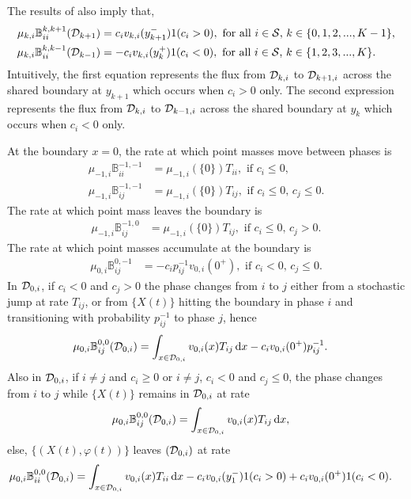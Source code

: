 The results of \cite{bo2014} also imply that, 
\begin{align*}
\mu_{k,i}\mathbb B_{ii}^{k,k+1}(\mathcal{D}_{k+1})&= c_iv_{k,i}(y_{k+1}^-) 1{(c_i>0)},\mbox{ for all \(i\in\mathcal{S}\), \(k\in\{0,1,2,...,K-1\}\),}
\\\mu_{k,i}\mathbb B_{ii}^{k,k-1}(\mathcal{D}_{k-1})&= -c_iv_{k,i}(y_{k}^+) 1{(c_i<0)}, \mbox{  for all \(i\in\mathcal{S}\), \(k\in\{1,2,3,...,K\}\)}.
\end{align*}
Intuitively, the first equation represents the flux from \(\mathcal{D}_{k,i}\) to \(\mathcal{D}_{k+1,i}\) across the shared boundary at \(y_{k+1}\) which occurs when \(c_i>0\) only. The second expression represents the flux from \(\mathcal{D}_{k,i}\) to \(\mathcal{D}_{k-1,i}\) across the shared boundary at \(y_{k}\) which occurs when \(c_i<0\) only. 

At the boundary \(x=0\), the rate at which point masses move between phases is 
\begin{align*}
	\mu_{-1,i}\mathbb B_{ii}^{{-1},{-1}} &= \mu_{-1,i}(\{0\})T_{ii},\mbox{ if } c_i\leq 0,\,\\
	\mu_{-1,i}\mathbb B_{ij}^{{-1},{-1}} &= \mu_{-1,i}(\{0\})T_{ij},\mbox{ if }c_i\leq 0,\,c_j\leq 0. 
	\end{align*}
	The rate at which point mass leaves the boundary is
	\begin{align*}
	\mu_{-1,i}\mathbb B_{ij}^{{-1},0} &= \mu_{-1,i}(\{0\})T_{ij},\mbox{ if }c_i\leq 0,\,c_j> 0. 
	\end{align*}
	The rate at which point masses accumulate at the boundary is 
	\begin{align*}
	\mu_{0,i}\mathbb B_{ij}^{0,{-1}} &= -c_ip^{{-1}}_{ij}v_{0,i}(0^+),\mbox{ if }c_i< 0,\,c_j\leq 0.
	\end{align*}
	In \(\mathcal{D}_{0,i}\), if \(c_i<0\) and \(c_j>0\) the phase changes from \(i\) to \(j\) either from a stochastic jump at rate \(T_{ij}\), or from \(\{X(t)\}\) hitting the boundary in phase \(i\) and transitioning with probability \(p_{ij}^{-1}\) to phase \(j\), hence
	\begin{align*}
	\mu_{0,i}\mathbb B_{ij}^{0,0}(\mathcal{D}_{0,i})&=\int_{x\in\mathcal{D}_{0,i}}v_{0,i}(x)T_{ij}\, \mathrm{d} x - c_iv_{0,i}(0^+)p^{-1}_{ij}.
	\end{align*}
	Also in \(\mathcal{D}_{0,i}\), if \(i\neq j\) and \(c_i\geq 0\) or \(i\neq j\), \(c_i< 0\) and \(c_j\leq 0\), the phase changes from \(i\) to \(j\) while \(\{X(t)\}\) remains in \(\mathcal{D}_{0,i}\) at rate
	\begin{align*}
	\mu_{0,i}\mathbb B_{ij}^{0,0}(\mathcal{D}_{0,i})&=\int_{x\in\mathcal{D}_{0,i}}v_{0,i}(x)T_{ij}\, \mathrm{d} x,
	\end{align*}
	else, \(\{(X(t),\varphi(t))\}\) leaves \((\mathcal{D}_{0,i})\) at rate
	\begin{align*}
	\mu_{0,i}\mathbb B_{ii}^{0,0}(\mathcal{D}_{0,i})&=\int_{x\in\mathcal{D}_{0,i}}v_{0,i}(x)T_{ii}\, \mathrm{d} x - c_iv_{0,i}(y_1^-) 1{(c_i> 0)} + c_iv_{0,i}(0^+)1{(c_i< 0)}.
\end{align*}

